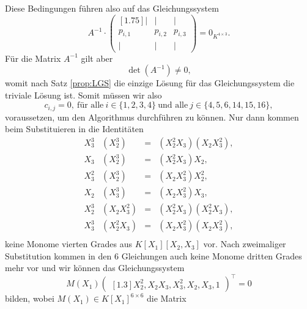 \documentclass[a4paper,oneside, 11pt, openany%
]{article}
\theoremstyle{custom}
\theoremstyle{custom}
\begin{document}
Diese Bedingungen führen also auf das Gleichungssystem
\begin{equation}
	A^{-1} \cdot \begin{pmatrix}[1.75]
		\vert & \vert & \vert \\
		p_{i,1}&p_{i,2}& p_{i,3}\\
		\vert & \vert & \vert
	\end{pmatrix}
	= 0_{K^{4 \times 3}}.
\end{equation}
Für die Matrix $A^{-1}$ gilt aber \begin{equation*}
	\det{\left(A^{-1}\right)} \neq 0,
\end{equation*} womit nach Satz \ref{prop:LGS} die einzige Lösung für das Gleichungssystem die triviale Lösung ist.
Somit müssen wir also
\begin{equation*}
	c_{i,j} = 0 , \ \text{für alle} \ i \in \{1,2,3,4\} \ \text{und alle} \ j \in \{4,5,6,14,15,16\},
\end{equation*}
voraussetzen, um den Algorithmus durchführen zu können.
Nur dann kommen beim Substituieren in die Identitäten
\begin{equation*}
	\begin{alignedat}{3}
		X_{3}^3&	\left( X_{2}^3\right)  &=& \left( X_{2}^2X_{3}\right) 	\left( X_{2}X_{3}^2\right), \\
		X_{3}&\left( X_{2}^3\right) &=&\left( X_{2}^2X_{3}\right) X_{2},\\
		X_{3}^2&	\left( X_{2}^3\right)  &=& \left(  X_{2}X_{3}^2\right) 	X_{2}^2,\\
		X_{2}&	\left( X_{3}^3\right)  &=& \left( X_{2}X_{3}^2\right) 	X_{3},\\
		X_{2}^3&	\left( X_{2}X_{3}^2\right)  &=& \left( X_{2}^2X_{3}\right)\left( X_{2}^2X_{3}\right),\\
		X_{3}^3&	\left( X_{2}^2X_{3}\right)  &=& \left( X_{2}X_{3}^2\right)\left( X_{2}X_{3}^2\right),\\
	\end{alignedat}
\end{equation*}
keine Monome vierten Grades aus $K[X_1][X_2,X_3]$ vor.
Nach zweimaliger Substitution kommen in den $6$ Gleichungen auch keine Monome dritten Grades mehr vor und wir können das Gleichungssystem
\begin{equation}
	M(X_{1})\begin{pmatrix}[1.3]
		X_{2}^2,
		X_{2}X_{3},
		X_{3}^2,
		X_{2},
		X_{3},
		1
	\end{pmatrix}^\top=0
\end{equation}
bilden, wobei $M(X_{1}) \in K[X_{1}]^{6 \times 6}$ die Matrix
\end{document}
